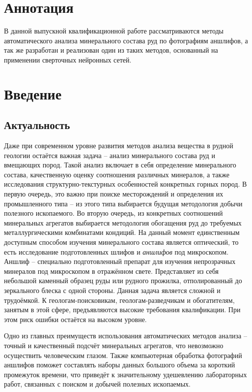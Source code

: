 

\usepackage{comment}





\pagestyle{fancy}

\fancyhead{} 
\fancyfoot{}
\cfoot{\thepage}
\renewcommand{\headrulewidth}{0pt}
\setcounter{page}{2}

\tableofcontents

\newpage
\setlength{\parskip}{0.5cm}
\parindent=1cm
\onehalfspacing

\section{Аннотация}

В данной выпускной квалификационной работе рассматриваются методы автоматического анализа минерального состава руд по фотографиям аншлифов, а так же разработан и реализован один из таких методов, основанный на применении сверточных нейронных сетей.

\newpage
\section{Введение}

\subsection{Актуальность}
Даже   при   современном   уровне   развития   методов   анализа   вещества   в   рудной   геологии остаётся важная задача -- анализ   минерального   состава   руд   и   вмещающих   пород. Такой анализ включает в себя определение минерального состава, качественную оценку соотношения различных минералов, а также исследования структурно-текстурных особенностей конкретных горных пород. В первую очередь, это важно при поиске месторождений и определения их промышленного типа -- из этого типа выбирается будущая методология   добычи   полезного   ископаемого. Во вторую очередь, из конкретных соотношений минеральных агрегатов выбирается методология обогащения руд до требуемых металлургическими комбинатами кондиций. На данный момент единственным доступным способом изучения минерального состава является оптический, то есть исследование подготовленных шлифов и   \textit{аншлифов} под микроскопом. Аншлиф – специально подготовленный препарат для изучения непрозрачных минералов под микроскопом в отражённом свете. Представляет из себя небольшой каменный образец
руды или рудного прожилка, отполированный до зеркального блеска с одной стороны. Данная задача является сложной и трудоёмкой. К геологам-поисковикам, геологам-разведчикам и обогатителям, занятым в этой сфере, предъявляются высокие требования квалификации. При этом риск ошибки остаётся на высоком уровне. \par Одно из главных преимуществ использования автоматических методов анализа – точный и качественный подсчёт минеральных агрегатов, что невозможно осуществить человеческим глазом. Также компьютерная обработка фотографий аншлифов поможет составлять наборы данных большого объема за короткий промежуток времени, что приведёт к значительному удешевлению лабораторных работ, связанных с поиском и добычей полезных ископаемых.

